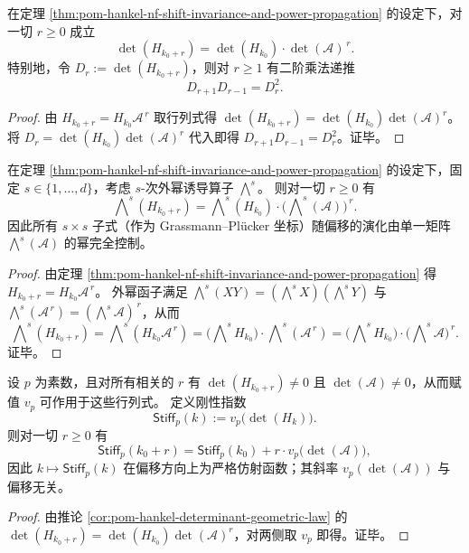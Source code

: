 \begin{corollary}\label{cor:pom-hankel-determinant-geometric-law}
在定理 \ref{thm:pom-hankel-nf-shift-invariance-and-power-propagation} 的设定下，对一切 \(r\ge 0\) 成立
\[
\det(H_{k_0+r})=\det(H_{k_0})\cdot \det(\mathcal A)^{\,r}.
\]
特别地，令 \(D_r:=\det(H_{k_0+r})\)，则对 \(r\ge 1\) 有二阶乘法递推
\[
D_{r+1}D_{r-1}=D_r^2.
\]
\end{corollary}
\begin{proof}
由 \(H_{k_0+r}=H_{k_0}\mathcal A^{\,r}\) 取行列式得
\(
\det(H_{k_0+r})=\det(H_{k_0})\det(\mathcal A)^r
\)。
将 \(D_r=\det(H_{k_0})\det(\mathcal A)^r\) 代入即得 \(D_{r+1}D_{r-1}=D_r^2\)。证毕。
\end{proof}

\begin{theorem}\label{thm:pom-hankel-exterior-power-propagation}
在定理 \ref{thm:pom-hankel-nf-shift-invariance-and-power-propagation} 的设定下，固定 \(s\in\{1,\dots,d\}\)，考虑 \(s\)-次外幂诱导算子 \(\bigwedge^s\)。
则对一切 \(r\ge 0\) 有
\[
\bigwedge\nolimits^s(H_{k_0+r})
=\bigwedge\nolimits^s(H_{k_0})\cdot \bigl(\bigwedge\nolimits^s(\mathcal A)\bigr)^{\,r}.
\]
因此所有 \(s\times s\) 子式（作为 Grassmann--Pl\"ucker 坐标）随偏移的演化由单一矩阵 \(\bigwedge^s(\mathcal A)\) 的幂完全控制。
\end{theorem}
\begin{proof}
由定理 \ref{thm:pom-hankel-nf-shift-invariance-and-power-propagation} 得 \(H_{k_0+r}=H_{k_0}\mathcal A^{\,r}\)。
外幂函子满足 \(\bigwedge^s(XY)=(\bigwedge^sX)(\bigwedge^sY)\) 与 \(\bigwedge^s(\mathcal A^{\,r})=(\bigwedge^s\mathcal A)^{\,r}\)，从而
\[
\bigwedge\nolimits^s(H_{k_0+r})
=\bigwedge\nolimits^s(H_{k_0}\mathcal A^{\,r})
=\bigl(\bigwedge\nolimits^s H_{k_0}\bigr)\cdot \bigwedge\nolimits^s(\mathcal A^{\,r})
=\bigl(\bigwedge\nolimits^s H_{k_0}\bigr)\cdot \bigl(\bigwedge\nolimits^s\mathcal A\bigr)^{\,r}.
\]
证毕。
\end{proof}

\begin{corollary}\label{cor:pom-hankel-stiffness-affine-law}
设 \(p\) 为素数，且对所有相关的 \(r\) 有 \(\det(H_{k_0+r})\neq 0\) 且 \(\det(\mathcal A)\neq 0\)，从而赋值 \(v_p\) 可作用于这些行列式。
定义刚性指数
\[
\mathsf{Stiff}_p(k):=v_p\!\bigl(\det(H_k)\bigr).
\]
则对一切 \(r\ge 0\) 有
\[
\mathsf{Stiff}_p(k_0+r)=\mathsf{Stiff}_p(k_0)+r\cdot v_p\!\bigl(\det(\mathcal A)\bigr),
\]
因此 \(k\mapsto \mathsf{Stiff}_p(k)\) 在偏移方向上为严格仿射函数；其斜率 \(v_p(\det(\mathcal A))\) 与偏移无关。
\end{corollary}
\begin{proof}
由推论 \ref{cor:pom-hankel-determinant-geometric-law} 的 \(\det(H_{k_0+r})=\det(H_{k_0})\det(\mathcal A)^r\)，对两侧取 \(v_p\) 即得。证毕。
\end{proof}

